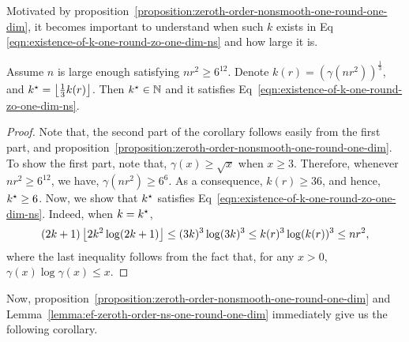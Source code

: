 Motivated by proposition~\ref{proposition:zeroth-order-nonsmooth-one-round-one-dim},
it becomes important to understand when such $k$ exists in Eq
\eqref{eqn:existence-of-k-one-round-zo-one-dim-ns} and how large it is. 
\begin{lemma}
\label{lemma:ef-zeroth-order-ns-one-round-one-dim}
Assume $n$ is large enough satisfying $nr^2 \geq 6^{12}$. 
Denote $k(r) = (\gamma(nr^2))^\frac{1}{3}$, 
and $k^\star = \left\lfloor{\frac{1}{3} k(r)}\right\rfloor$. Then $k ^\star \in \mathbb{N}$ 
and it satisfies Eq~\eqref{eqn:existence-of-k-one-round-zo-one-dim-ns}.
\end{lemma}
\begin{proof}
Note that, the second part of the corollary follows easily from the first part,
and proposition~\ref{proposition:zeroth-order-nonsmooth-one-round-one-dim}.
To show the first part, note that, $\gamma(x) \geq \sqrt{x}$ when $x\geq 3$. 
Therefore, whenever $nr^2 \geq 6^{12}$, we have, $\gamma(nr^2) \geq 6^6$. 
As a consequence, $k(r) \geq 36$, and hence, $k^\star \geq 6$. Now, we show 
that $k^\star$ satisfies Eq~\eqref{eqn:existence-of-k-one-round-zo-one-dim-ns}. 
Indeed, when $k = k^\star$, 
\begin{equation*}
(2k+1) \left\lfloor{2k^2\log(2k+1)}\right\rfloor \leq (3k)^3 \log(3k)^3 \leq k(r)^3 \log (k(r))^3 
	\leq nr^2,
\end{equation*}
where the last inequality follows from the fact that, for any $x > 0$, $\gamma(x)
\log \gamma(x) \leq x$. 
\end{proof}
Now, proposition~\ref{proposition:zeroth-order-nonsmooth-one-round-one-dim}
and Lemma~\ref{lemma:ef-zeroth-order-ns-one-round-one-dim} immediately 
give us the following corollary. 


